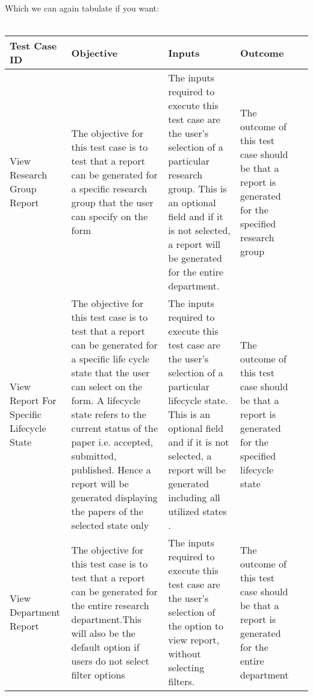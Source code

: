 Which we can again tabulate if you want: \\\\
\begin{tabular}{ L{3cm}| L{3cm}| L{3cm}| L{3cm}| L{0cm}} 
	\hline      
	\textbf{Test Case ID} & \textbf{Objective} & \textbf{Inputs} & \textbf{Outcome}\\
	\hline 
	\hline
	View Research Group Report  &  
	The objective for this test case is to test that a report can be generated for a specific research group that the user can specify on the form & 
	The inputs required to execute this test case are the user's selection of a particular research group. This is an optional field and if it is not selected, a report will be generated for the entire department. & 
	The outcome of this test case should be that a report is generated for the specified research group & \\
	\hline 
View Report For Specific Lifecycle State  &  
	The objective for this test case is to test that a report can be generated for a specific life cycle state that the user can select on the form. A lifecycle state refers to the current status of the paper i.e. accepted, submitted, published. Hence a report will be generated displaying the papers of the selected state only & 
	The inputs required to execute this test case are the user's selection of a particular lifecycle state. This is an optional field and if it is not selected, a report will be generated including all utilized states . & 
	The outcome of this test case should be that a report is generated for the specified lifecycle state & \\ 
	\hline 
View Department Report &  
	The objective for this test case is to test that a report can be generated for the entire research department.This will also be the default option if users do not select filter options & 
	The inputs required to execute this test case are the user's selection of the option to view report, without selecting filters. & 
	The outcome of this test case should be that a report is generated for the entire department& \\ 
\end{tabular}
\\
